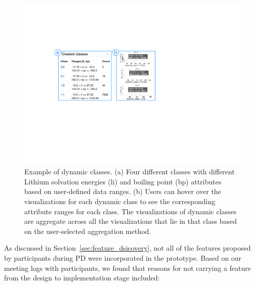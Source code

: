  \begin{figure}[h!]
   \centering
   \includegraphics[width=0.9\linewidth]{figures/dcc.pdf}
   \caption{Example of dynamic classes. (a) Four different classes with different Lithium solvation energies (li) and boiling point (bp) attributes based on user-defined data ranges. (b) Users can hover over the visualizations for each dynamic class to see the corresponding attribute ranges for each class. The visualizations of dynamic classes are aggregate across all the visualizations that lie in that class based on the user-selected aggregation method.}
   \label{dcc}
 \end{figure}
 \npar As discussed in Section~\ref{sec:feature_dsicovery}, not all of the features proposed by participants during PD were incorporated in the \zvpp prototype. Based on our meeting logs with participants, we found that reasons for not carrying a feature from the design to implementation stage included:
